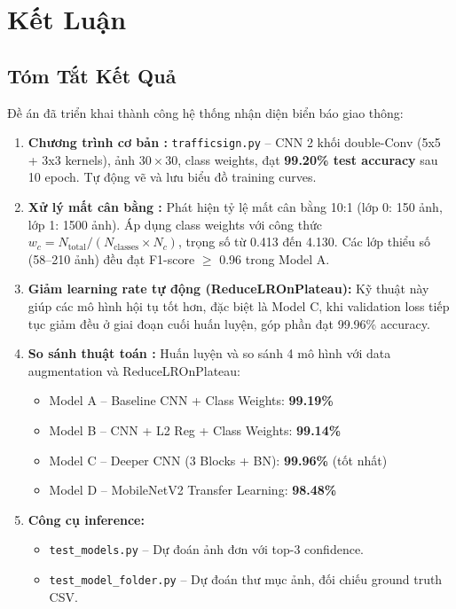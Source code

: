 \documentclass[12pt,a4paper]{article}
\begin{document}
\section{Kết Luận}

\subsection{Tóm Tắt Kết Quả}
Đề án đã triển khai thành công hệ thống nhận diện biển báo giao thông:

\begin{enumerate}[leftmargin=*]
    \item \textbf{Chương trình cơ bản :} \texttt{trafficsign.py} -- CNN 2 khối double-Conv (5x5 + 3x3 kernels), ảnh $30\times30$, class weights, đạt \textbf{99.20\% test accuracy} sau 10 epoch. Tự động vẽ và lưu biểu đồ training curves.
    \item \textbf{Xử lý mất cân bằng :} Phát hiện tỷ lệ mất cân bằng 10:1 (lớp 0: 150 ảnh, lớp 1: 1500 ảnh). Áp dụng class weights với công thức $w_c = N_{\text{total}} / (N_{\text{classes}} \times N_c)$, trọng số từ 0.413 đến 4.130. Các lớp thiểu số (58--210 ảnh) đều đạt F1-score $\ge$ 0.96 trong Model A.
    \item \textbf{Giảm learning rate tự động (ReduceLROnPlateau):} Kỹ thuật này giúp các mô hình hội tụ tốt hơn, đặc biệt là Model C, khi validation loss tiếp tục giảm đều ở giai đoạn cuối huấn luyện, góp phần đạt 99.96\% accuracy.
    \item \textbf{So sánh thuật toán :} Huấn luyện và so sánh 4 mô hình với data augmentation và ReduceLROnPlateau:
    \begin{itemize}
        \item Model A -- Baseline CNN + Class Weights: \textbf{99.19\%}
        \item Model B -- CNN + L2 Reg + Class Weights: \textbf{99.14\%}
        \item Model C -- Deeper CNN (3 Blocks + BN): \textbf{99.96\%} (tốt nhất)
        \item Model D -- MobileNetV2 Transfer Learning: \textbf{98.48\%}
    \end{itemize}
    \item \textbf{Công cụ inference:}
    \begin{itemize}
        \item \texttt{test\_models.py} -- Dự đoán ảnh đơn với top-3 confidence.
        \item \texttt{test\_model\_folder.py} -- Dự đoán thư mục ảnh, đối chiếu ground truth CSV.
    \end{itemize}
\end{enumerate}
\end{document}
